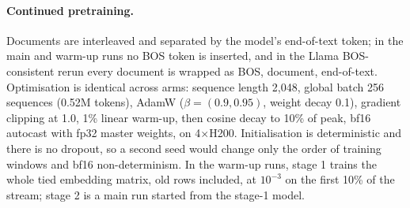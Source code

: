 \paragraph{Continued pretraining.} Documents are interleaved and separated by the model's end-of-text token; in the main and warm-up runs no BOS token is inserted, and in the Llama BOS-consistent rerun every document is wrapped as BOS, document, end-of-text. Optimisation is identical across arms: sequence length 2{,}048, global batch 256 sequences (0.52M tokens), AdamW ($\beta = (0.9, 0.95)$, weight decay 0.1), gradient clipping at 1.0, 1\% linear warm-up, then cosine decay to 10\% of peak, bf16 autocast with fp32 master weights, on 4$\times$H200. Initialisation is deterministic and there is no dropout, so a second seed would change only the order of training windows and bf16 non-determinism. In the warm-up runs, stage 1 trains the whole tied embedding matrix, old rows included, at $10^{-3}$ on the first 10\% of the stream; stage 2 is a main run started from the stage-1 model.

